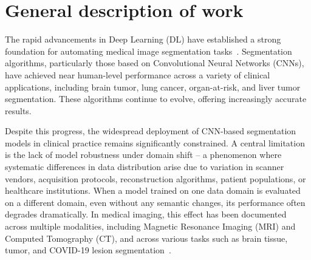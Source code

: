 \section*{General description of work} 



The rapid advancements in Deep Learning (DL) have established a strong foundation for automating medical image segmentation tasks~\cite{lee2017deep}. Segmentation algorithms, particularly those based on Convolutional Neural Networks (CNNs), have achieved near human-level performance across a variety of clinical applications, including brain tumor, lung cancer, organ-at-risk, and liver tumor segmentation. These algorithms continue to evolve, offering increasingly accurate results.


Despite this progress, the widespread deployment of CNN-based segmentation models in clinical practice remains significantly constrained. A central limitation is the lack of model robustness under domain shift -- a phenomenon where systematic differences in data distribution arise due to variation in scanner vendors, acquisition protocols, reconstruction algorithms, patient populations, or healthcare institutions. When a model trained on one data domain is evaluated on a different domain, even without any semantic changes, its performance often degrades dramatically. In medical imaging, this effect has been documented across multiple modalities, including Magnetic Resonance Imaging (MRI) and Computed Tomography (CT), and across various tasks such as brain tissue, tumor, and COVID-19 lesion segmentation~\cite{shirokikh2020first,zakazov2021anatomy,saparov2021zero,shimovolos2022adaptation}.

